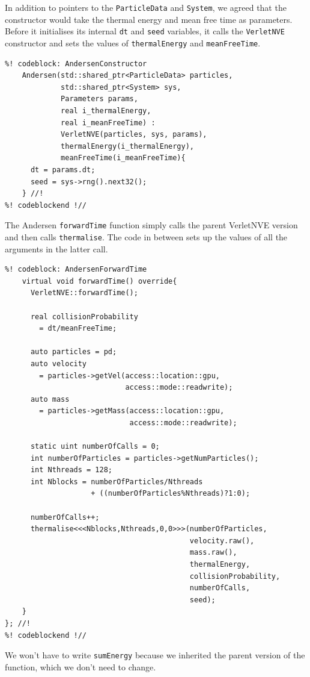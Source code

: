 In addition to pointers to the \texttt{ParticleData} and \texttt{System}, we 
agreed that the constructor would take the thermal energy and mean free time as 
parameters. Before it initialises its internal \texttt{dt} and \texttt{seed} 
variables, it calls the \texttt{VerletNVE} constructor and sets the values of
\texttt{thermalEnergy} and \texttt{meanFreeTime}.
\begin{lstlisting}
%! codeblock: AndersenConstructor
    Andersen(std::shared_ptr<ParticleData> particles,
             std::shared_ptr<System> sys,
             Parameters params,
             real i_thermalEnergy,
             real i_meanFreeTime) :
             VerletNVE(particles, sys, params),
             thermalEnergy(i_thermalEnergy),
             meanFreeTime(i_meanFreeTime){
      dt = params.dt;
      seed = sys->rng().next32();
    } //!
%! codeblockend !//
\end{lstlisting}

The Andersen \texttt{forwardTime} function simply calls the parent VerletNVE 
version and then calls \texttt{thermalise}. The code in between sets up the 
values of all the arguments in the latter call.
\begin{lstlisting}
%! codeblock: AndersenForwardTime
    virtual void forwardTime() override{
      VerletNVE::forwardTime();

      real collisionProbability
        = dt/meanFreeTime;

      auto particles = pd;
      auto velocity
        = particles->getVel(access::location::gpu,
                            access::mode::readwrite);
      auto mass
        = particles->getMass(access::location::gpu,
                             access::mode::readwrite);

      static uint numberOfCalls = 0;
      int numberOfParticles = particles->getNumParticles();
      int Nthreads = 128;
      int Nblocks = numberOfParticles/Nthreads
                    + ((numberOfParticles%Nthreads)?1:0);

      numberOfCalls++;
      thermalise<<<Nblocks,Nthreads,0,0>>>(numberOfParticles,
                                           velocity.raw(),
                                           mass.raw(),
                                           thermalEnergy,
                                           collisionProbability,
                                           numberOfCalls,
                                           seed);
    }
}; //!
%! codeblockend !//
\end{lstlisting}
We won't have to write \texttt{sumEnergy} because we inherited the parent 
version of the function, which we don't need to change.

